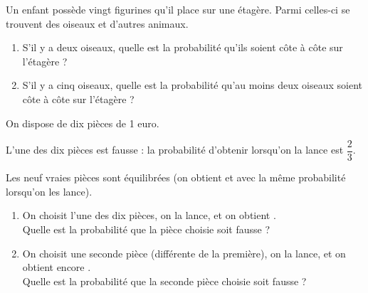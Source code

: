 \begin{exo}
Un enfant possède vingt figurines qu'il place sur une étagère. Parmi celles-ci se trouvent des oiseaux et d'autres animaux.

\begin{enumerate}
    \item S'il y a deux oiseaux, quelle est la probabilité qu'ils soient côte à côte sur l'étagère ? \\
    \item S'il y a cinq oiseaux, quelle est la probabilité qu'au moins deux oiseaux soient côte à côte sur l'étagère ?
\end{enumerate}
\end{exo}

\begin{corr}
\end{corr}

\begin{exo}[Exercice 7]
On dispose de dix pièces de 1 euro.

L'une des dix pièces est fausse : la probabilité d'obtenir  lorsqu'on la lance est \(\dfrac{2}{3}\).

Les neuf vraies pièces sont équilibrées (on obtient  et  avec la même probabilité lorsqu'on les lance).

\begin{enumerate}
    \item On choisit l'une des dix pièces, on la lance, et on obtient . \\ Quelle est la probabilité que la pièce choisie soit fausse ? \\
    \item On choisit une seconde pièce (différente de la première), on la lance, et on obtient encore . \\ Quelle est la probabilité que la seconde pièce choisie soit fausse ?
\end{enumerate}
\end{exo}

\begin{corr}
\end{corr}

